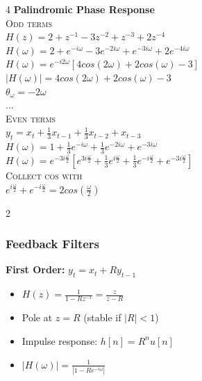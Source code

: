 \documentclass[8pt,landscape,a4paper]{article}
\begin{document}
\begin{multicols}{4}
\textbf{Palindromic Phase Response} \\
\textsc{Odd terms}\\
$H(z) = 2 + z^{-1} - 3z^{-2} +z^{-3} +2z^{-4}$\\
$H(\omega) = 2 + e^{-i\omega} - 3e^{-2i\omega} + e^{-3i\omega} + 2e^{-4i\omega}$\\
$H(\omega) = e^{-i2\omega}[4cos(2\omega) + 2cos(\omega) -3]$ \\
$|H(\omega)| = 4cos(2\omega) + 2cos(\omega) -3$ \\
$ \theta_\omega = -2\omega$\\
...\\
\textsc{Even terms}\\
$y_t = x_t + \frac{1}{3}x_{t-1} + \frac{1}{3}x_{t-2}+ x_{t-3}$ \\
$H(\omega) = 1 + \frac{1}{3}e^{-i\omega} + \frac{1}{3}e^{-2i\omega}+ e^{-3i\omega}$ \\
$H(\omega) = e^{-3i\frac{\omega}{2}}[e^{3i\frac{\omega}{2}} + \frac{1}{3}
e^{i\frac{\omega}{2}} + \frac{1}{3}e^{-i\frac{\omega}{2}} + e^{-3i\frac{\omega}{2}}]$\\
\textsc{Collect cos with}\\
$ e^{i\frac{\omega}{2}} + e^{-i\frac{\omega}{2}} = 2cos(\frac{\omega}{2})$

\begin{multicols}{2}
\end{multicols}

\subsubsection*{Feedback Filters}
\textbf{First Order:} $y_t = x_t + Ry_{t-1}$
\begin{itemize}
\item $H(z) = \frac{1}{1-Rz^{-1}} = \frac{z}{z-R}$
\item Pole at $z = R$ (stable if $|R| < 1$)
\item Impulse response: $h[n] = R^n u[n]$
\item $|H(\omega)| = \frac{1}{|1 - Re^{-i\omega}|}$
\end{itemize}


\end{multicols}
\end{document}
